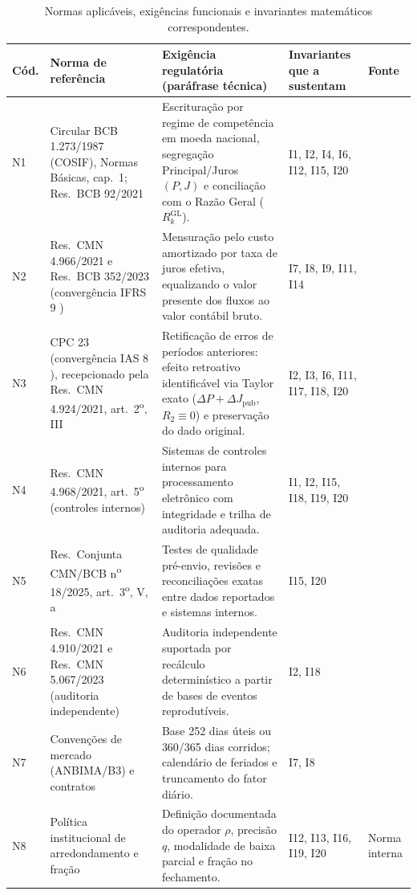 \documentclass[11pt, a4paper]{article}
\theoremstyle{definition}
\theoremstyle{plain}
\theoremstyle{remark}
\begin{document}
\begin{table}[htbp]
\centering
\footnotesize
\renewcommand{\arraystretch}{1.25}
\begin{tabularx}{\textwidth}{@{}l >{\raggedright\arraybackslash}p{3.6cm} X >{\raggedright\arraybackslash}p{2.4cm} l@{}}
\toprule
\textbf{Cód.} & \textbf{Norma de referência} & \textbf{Exigência regulatória (paráfrase técnica)} & \textbf{Invariantes que a sustentam} & \textbf{Fonte} \\
\midrule
N1 & Circular BCB 1.273/1987 (COSIF), Normas Básicas, cap.\ 1; Res.\ BCB 92/2021 & Escrituração por regime de competência em moeda nacional, segregação Principal/Juros $(P, J)$ e conciliação com o Razão Geral ($R_k^{\text{GL}}$). & I1, I2, I4, I6, I12, I15, I20 & \cite{N1} \\
N2 & Res.\ CMN 4.966/2021 e Res.\ BCB 352/2023 (convergência IFRS 9 \cite{IASB}) & Mensuração pelo custo amortizado por taxa de juros efetiva, equalizando o valor presente dos fluxos ao valor contábil bruto. & I7, I8, I9, I11, I14 & \cite{N2, IASB} \\
N3 & CPC 23 (convergência IAS 8 \cite{IASB}), recepcionado pela Res.\ CMN 4.924/2021, art.\ 2\textsuperscript{o}, III & Retificação de erros de períodos anteriores: efeito retroativo identificável via Taylor exato ($\Delta P + \Delta J_{\text{pub}}$, $R_2\equiv 0$) e preservação do dado original. & I2, I3, I6, I11, I17, I18, I20 & \cite{N3, IASB} \\
N4 & Res.\ CMN 4.968/2021, art.\ 5\textsuperscript{o} (controles internos) & Sistemas de controles internos para processamento eletrônico com integridade e trilha de auditoria adequada. & I1, I2, I15, I18, I19, I20 & \cite{N4} \\
N5 & Res.\ Conjunta CMN/BCB n\textsuperscript{o} 18/2025, art.\ 3\textsuperscript{o}, V, a & Testes de qualidade pré-envio, revisões e reconciliações exatas entre dados reportados e sistemas internos. & I15, I20 & \cite{N5} \\
N6 & Res.\ CMN 4.910/2021 e Res.\ CMN 5.067/2023 (auditoria independente) & Auditoria independente suportada por recálculo determinístico a partir de bases de eventos reprodutíveis. & I2, I18 & \cite{N6} \\
N7 & Convenções de mercado (ANBIMA/B3) e contratos & Base 252 dias úteis ou 360/365 dias corridos; calendário de feriados e truncamento do fator diário. & I7, I8 & \cite{N7, AssafNeto, Fabozzi2006, ISDA2006} \\
N8 & Política institucional de arredondamento e fração & Definição documentada do operador $\rho$, precisão $q$, modalidade de baixa parcial e fração no fechamento. & I12, I13, I16, I19, I20 & Norma interna \\
\bottomrule
\end{tabularx}
\caption{Normas aplicáveis, exigências funcionais e invariantes matemáticos correspondentes.}
\label{tab:9}
\end{table}
\end{document}
